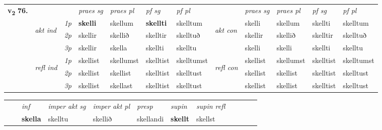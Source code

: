 \begin{tabular}{llllllllllll} \toprule
\multirow{4}{*}{{{\textbf{v{\textsubscript{2}}} \Large{\textbf{76.}}}}}  & &   &  \textit{praes sg}  & \textit{praes pl}  &\textit{ pf sg} & \textit{pf pl} &  &  \textit{praes sg}  & \textit{praes pl}  & \textit{pf sg} & \textit{pf pl } \\*
	\cmidrule{4-7} \cmidrule{9-12}
 & \multirow{3}{*}{\begin{turn}{90}\textit{akt ind}\end{turn}} & {\textit{1p}} & \textbf{skelli} & skellum    & \textbf{skellti} & skelltum & \multirow{3}{*}{\begin{turn}{90}\textit{akt con}\end{turn}} &skelli & skellum & skellti & skelltum\\*
& &  {\textit{2p}} &  skellir  & skellið   & skelltir & skelltuð & & skellir & skellið & skelltir & skelltuð \\*
& &  {\textit{3p}} & skellir & skella   & skellti & skelltu & & skelli & skelli& skellti & skelltu  \\*
\cmidrule{4-7} \cmidrule{9-12}
 &\multirow{3}{*}{\begin{turn}{90}\textit{refl ind}\end{turn}} & {\textit{1p}} & skellist & skellumst    & skelltist & skelltumst & \multirow{3}{*}{\begin{turn}{90}\textit{refl con}\end{turn}}  &skellist & skellumst & skelltist & skelltumst\\*
 &&  {\textit{2p}} &  skellist  & skellist   & skelltist & skelltust & &skellist & skellist & skelltist & skelltust \\*
& &  {\textit{3p}} & skellist & skellast   & skelltist & skelltust & & skellist & skellist& skelltist & skelltust  \\*
\cmidrule{4-7} \cmidrule{9-12}
\end{tabular}


\begin{tabular}{llllllllllll}
 & & \textit{inf} & \textit{imper akt sg} & \textit{imper akt pl}   & \textit{presp} & \textit{supin} & \textit{supin refl}      \\*
  & & \textbf{skella} & skelltu  & skellið   & skellandi &  \textbf{skellt} & skellst  \\*
\cmidrule{1-12}
\end{tabular}



